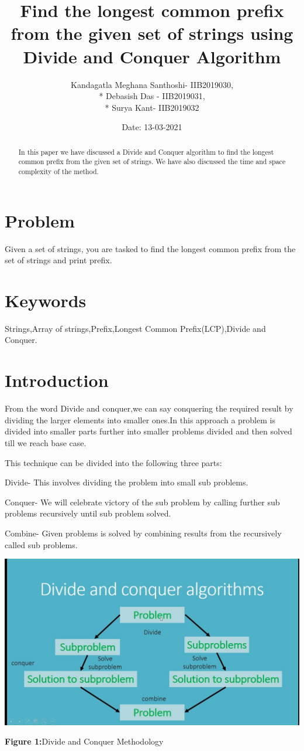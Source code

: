 \documentclass{article}
\title{\textbf{Find the longest common prefix from the given set of strings using Divide and Conquer Algorithm}}
\author{Kandagatla Meghana Santhoshi- IIB2019030,\\* Debasish Das - IIB2019031, \\* Surya Kant- IIB2019032 }
\date{Date: 13-03-2021}
\begin{document}
\maketitle
\begin{abstract}
In this paper we have discussed a Divide and Conquer
algorithm to find the longest common prefix from the given set of strings. We have also discussed the time and space complexity of the method.
\end{abstract}

\begin{multicols}{2}

\section{Problem}
Given a set of strings, you are tasked to find the longest common prefix from the set of strings and print prefix.

\section{Keywords}
Strings,Array of strings,Prefix,Longest Common Prefix(LCP),Divide and Conquer.

\section{Introduction}
From the word Divide and conquer,we can say conquering the required result by  dividing the larger elements into smaller ones.In this approach a problem is divided into smaller parts further into smaller problems divided and then solved till we reach base case.

This technique can be divided into the following three parts:

Divide- This involves dividing the problem into small sub problems.

Conquer- We will celebrate victory of the sub problem by calling further sub problems recursively until sub problem solved.

Combine- Given problems is solved by combining results from the recursively called sub problems.

\includegraphics[scale=0.20]{Divide and Conquerjpg.jpg}
\begin{center}\textbf{Figure 1:}Divide and Conquer Methodology\end{center}


\end{multicols}
\end{document}
